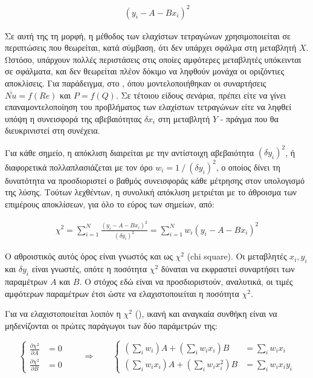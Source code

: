 \begin{refsection}
\begin{align}\label{eqn:chi1}
\left(y_i - A - B x_i\right)^2
\end{align}

\noindent Σε αυτή της τη μορφή, η μέθοδος των ελαχίστων τετραγώνων χρησιμοποιείται σε περιπτώσεις που θεωρείται, κατά σύμβαση, ότι δεν υπάρχει σφάλμα στη μεταβλητή $X$. Ωστόσο, υπάρχουν πολλές περιστάσεις στις οποίες αμφότερες μεταβλητές υπόκεινται σε σφάλματα, και δεν θεωρείται πλέον δόκιμο να ληφθούν μονάχα οι οριζόντιες αποκλίσεις. Για παράδειγμα, στο , όπου μοντελοποιήθηκαν οι συναρτήσεις $\overline{Nu} = f(Re)$ και $P = f(Q)$. Σε τέτοιου είδους σενάρια, πρέπει είτε να γίνει επαναμοντελοποίηση του προβλήματος των ελαχίστων τετραγώνων \parencites{2001_Glaister}{1964_Deming_BOOK}{1987_Kendall_BOOK}{2006_Fuller_BOOK}{1993_Linnet} είτε να ληφθεί υπόψη η συνεισφορά της αβεβαιότητας $\delta x_i$ στη μεταβλητή $Y$ - πράγμα που θα διευκρινιστεί στη συνέχεια.

Για κάθε σημείο, η απόκλιση  διαιρείται με την αντίστοιχη αβεβαιότητα $\left(\delta y_i\right)^2$, ή διαφορετικά πολλαπλασιάζεται με τον όρο $w_i = 1 \: / \: \left(\delta y_i\right)^2$, ο οποίος δίνει τη δυνατότητα να προσδιοριστεί ο βαθμός συνεισφοράς κάθε μέτρησης στον υπολογισμό της λύσης. Τούτων λεχθέντων, η συνολική απόκλιση μετριέται με το άθροισμα των επιμέρους αποκλίσεων, για όλο το εύρος των σημείων, από:

\begin{align}\label{eq:chi1}
\chi ^2 = \displaystyle\sum_{i = 1} ^{N} \frac{\left(y_i - A - B x_i\right)^2}{\left(\delta y_i\right)^2} = \displaystyle\sum_{i = 1} ^{N} w_i \left(y_i - A - B x_i\right)^2
\end{align}

\noindent Ο αθροιστικός αυτός όρος είναι γνωστός και ως $\chi^2$ (chi square). Οι μεταβλητές $x_i, y_i$ και $\delta y_i$ είναι γνωστές, οπότε η ποσότητα $\chi^2$ δύναται να εκφραστεί συναρτήσει των παραμέτρων $A$ και $B$. Ο στόχος εδώ είναι να προσδιοριστούν, αναλυτικά, οι τιμές αμφότερων παραμέτρων έτσι ώστε να ελαχιστοποιείται η ποσότητα $\chi^2$. 

Για να ελαχιστοποιείται λοιπόν η $\chi^2$ (), ικανή και αναγκαία συνθήκη είναι να μηδενίζονται οι πρώτες παράγωγοι των δύο παράμετρών της:

\begin{equation}\label{eq:sol}
\left\{
\begin{aligned}
\frac{\partial \chi ^2}{\partial A} &= 0\\
\frac{\partial \chi ^2}{\partial B} &= 0
\end{aligned} \right.
\qquad
\Longrightarrow
\qquad
\left\{
\begin{aligned}
\left(\sum\nolimits_i w_i\right) A + \left(\sum\nolimits_i w_i x_i\right) B &=  \sum\nolimits_i w_i x_i\\
\left(\sum\nolimits_i w_i x_i\right) A + \left(\sum\nolimits_i w_i x_i ^2\right) B &=  \sum\nolimits_i w_i x_i y_i
\end{aligned} \right.
\end{equation}


\end{refsection}
